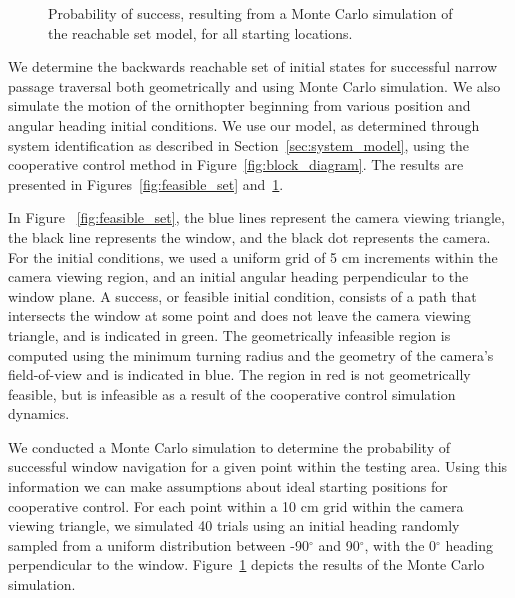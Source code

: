 \documentclass{aamas2013}
\begin{document}
\begin{figure}[tb]
\begin{minipage}[t]{0.47\linewidth}
\caption{Probability of success, resulting from a Monte Carlo simulation of
the reachable set model, for all starting locations.}
\label{fig:heat_map}
\end{minipage}
\end{figure}

We determine the backwards reachable set of initial states for successful
narrow passage traversal both geometrically and using Monte Carlo simulation.
We also simulate the motion of the ornithopter beginning from various position
and angular heading initial conditions. We use our model, as determined
through system identification as described in Section~\ref{sec:system_model},
using the cooperative control method in Figure~\ref{fig:block_diagram}. The
results are presented in Figures~\ref{fig:feasible_set}
and~\ref{fig:heat_map}.

In Figure ~\ref{fig:feasible_set}, 
the blue lines represent the camera viewing triangle, the black line represents the window, and the black 
dot represents the camera. For the initial conditions, we used a uniform
grid of 5 cm increments within the camera viewing region, and an initial
angular heading perpendicular to the window plane. A success, or feasible 
initial condition, consists of a path that intersects the window at some 
point and does not leave the camera viewing triangle, and is indicated in 
green. The geometrically infeasible region is computed using the minimum 
turning radius and the geometry of the camera's field-of-view and is 
indicated in blue. The region in red is not geometrically feasible, but is 
infeasible as a result of the cooperative control simulation dynamics.

We conducted a Monte Carlo simulation to determine the probability of
successful window navigation for a given point within the testing area. Using
this information we can make assumptions about ideal starting positions for
cooperative control. For each point within a 10 cm grid within the camera
viewing triangle, we simulated 40 trials using an initial heading randomly
sampled from a uniform distribution between -90$^{\circ}$ and 90$^{\circ}$,
with the 0$^{\circ}$ heading perpendicular to the window.
Figure~\ref{fig:heat_map} depicts the results of the Monte Carlo simulation.
\end{document}
